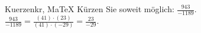 \begin{MAufgabe}{Kuerzen}{kr, MaTeX}
K\"urzen Sie soweit m\"oglich: $\frac{943}{-1189}$.\\ 
\ifLsg\MLoesung
\quad $\frac{943}{-1189}=\frac{(41)\cdot(23)}{(41)\cdot(-29)}=\frac{23}{-29}$.\else\relax\fi
 \end{MAufgabe}
